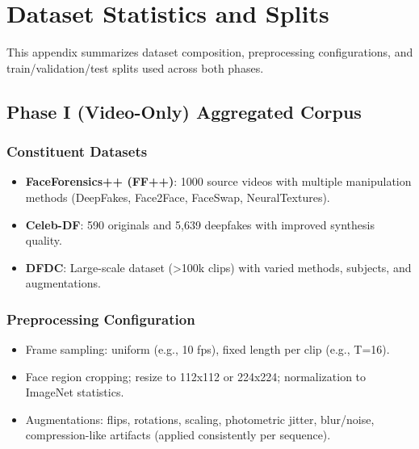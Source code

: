 \chapter{Dataset Statistics and Splits}
\label{app:dataset-stats}

This appendix summarizes dataset composition, preprocessing configurations, and train/validation/test splits used across both phases.

\section{Phase I (Video-Only) Aggregated Corpus}
\subsection{Constituent Datasets}
\begin{itemize}
    \item \textbf{FaceForensics++ (FF++)}: 1000 source videos with multiple manipulation methods (DeepFakes, Face2Face, FaceSwap, NeuralTextures).
    \item \textbf{Celeb-DF}: 590 originals and 5{,}639 deepfakes with improved synthesis quality.
    \item \textbf{DFDC}: Large-scale dataset (\textgreater 100k clips) with varied methods, subjects, and augmentations.
\end{itemize}

\subsection{Preprocessing Configuration}
\begin{itemize}
    \item Frame sampling: uniform (e.g., 10 fps), fixed length per clip (e.g., T=16).
    \item Face region cropping; resize to 112x112 or 224x224; normalization to ImageNet statistics.
    \item Augmentations: flips, rotations, scaling, photometric jitter, blur/noise, compression-like artifacts (applied consistently per sequence).
\end{itemize}


